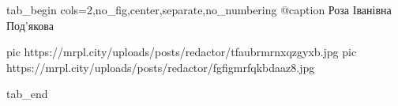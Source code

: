  
 
 
 
 

\ifcmt
  tab_begin cols=2,no_fig,center,separate,no_numbering
     @caption Роза Іванівна Под'якова

     pic https://mrpl.city/uploads/posts/redactor/tfaubrmrnxqzgyxb.jpg
     pic https://mrpl.city/uploads/posts/redactor/fgfigmrfqkbdaaz8.jpg

  tab_end
\fi

